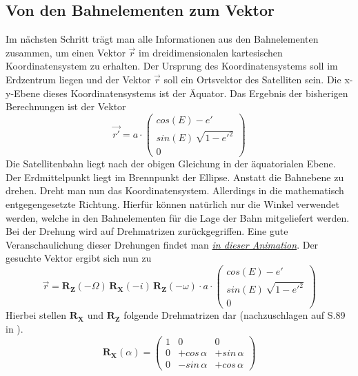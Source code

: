 \subsection{Von den Bahnelementen zum Vektor}
Im nächsten Schritt trägt man alle Informationen aus den Bahnelementen zusammen, um einen Vektor \ensuremath{\vec{r}} im dreidimensionalen kartesischen Koordinatensystem zu erhalten. Der Ursprung des Koordinatensystems soll im Erdzentrum liegen und der Vektor \ensuremath{\vec{r}} soll ein Ortsvektor des Satelliten sein. Die x-y-Ebene dieses Koordinatensystems ist der Äquator. Das Ergebnis der bisherigen Berechnungen ist der Vektor
\begin{equation}
	\vec{r'}=a\cdot\left(\begin{array}{c}cos(E)-e'\\ sin(E)\,\sqrt{1-e'^2} \\0\end{array}\right)
\end{equation}
Die Satellitenbahn liegt nach der obigen Gleichung in der äquatorialen Ebene. Der Erdmittelpunkt liegt im Brennpunkt der Ellipse. Anstatt die Bahnebene zu drehen. Dreht man nun das Koordinatensystem. Allerdings in die mathematisch entgegengesetzte Richtung. Hierfür können natürlich nur die Winkel verwendet werden, welche in den Bahnelementen für die Lage der Bahn mitgeliefert werden. Bei der Drehung wird auf Drehmatrizen zurückgegriffen. Eine gute Veranschaulichung dieser Drehungen findet man \href{https://www.youtube.com/watch?v=QZrYaKwZwhI}{\textit{in dieser Animation}}. Der gesuchte Vektor ergibt sich nun zu
\begin{equation}
	\vec{r}=\mathbf{R_Z}(-\Omega)\,\mathbf{R_X}(-i)\,\mathbf{R_Z}(-\omega)\cdot a\cdot\left(\begin{array}{c}cos(E)-e'\\ sin(E)\,\sqrt{1-e'^2} \\0\end{array}\right) 
\end{equation}  
Hierbei stellen \ensuremath{\mathbf{R_X}} und \ensuremath{\mathbf{R_Z}} folgende Drehmatrizen dar (nachzuschlagen auf S.89 in \cite{HandRaum}). 
\begin{equation}
\mathbf{R_X}(\alpha) = 
	\left(
		\begin{array}{ccc}
			1 & 0 & 0 \\
			0 & +cos\,\alpha & +sin\,\alpha\\
			0 & -sin\,\alpha & +cos\,\alpha
		\end{array}
	\right)
\end{equation}
